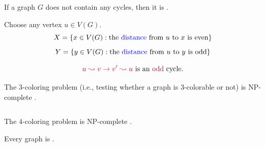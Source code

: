 \begin{frame}{}
  \begin{Lemma}
    If a graph $G$ does not contain any  cycles,
    then it is .
  \end{Lemma}

  \pause
  \vspace{0.30cm}
  \begin{center}
    Choose any vertex $u \in V(G)$.
    \pause
    \[
      X = \{x \in V(G) : \text{the \textcolor{blue}{distance} from $u$ to $x$ is even}\}
    \]
    \[
      Y = \{y \in V(G) : \text{the \textcolor{blue}{distance} from $u$ to $y$ is odd}\}
    \]

    \pause
    \vspace{-0.30cm}
    \pause
    \vspace{-0.50cm}
    \[
      \textcolor{purple}{u \leadsto v \to v' \leadsto u} \text{ is an \textcolor{purple}{odd} cycle.}
    \]
  \end{center}
\end{frame}

\begin{frame}{}
  \begin{theorem}{}
    The $3$-coloring problem (i.e., testing whether a graph is $3$-colorable or not)
    is \textsf{NP-complete} .
  \end{theorem}

  \pause
  \begin{columns}
  \end{columns}
\end{frame}

\begin{frame}{}
  \begin{theorem}{}
    The $4$-coloring problem is \textsf{NP-complete} .
  \end{theorem}

  \vspace{0.50cm}

  \pause
  \begin{theorem}
    Every   graph is .
  \end{theorem}
\end{frame}

